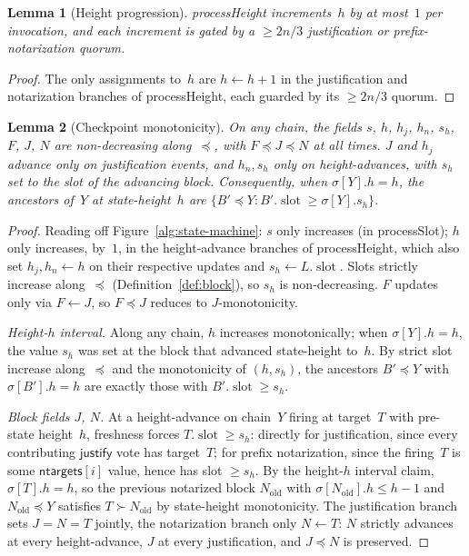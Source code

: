 \documentclass{article}
\newcommand{\slot}[0]{\ensuremath{\operatorname{\mathrm{slot}}}}
\newcommand{\just}{\ensuremath{\mathsf{justify}}\xspace}
\newcommand{\ntargets}{\mathsf{ntargets}}
\newcommand{\processSlot}{\textsf{processSlot}\xspace}
\newcommand{\processHeight}{\textsf{processHeight}\xspace}
\theoremstyle{plain}
\newtheorem{lemma}{Lemma}
\theoremstyle{definition}
\theoremstyle{remark}
\begin{document}
\begin{lemma}[Height progression]\label{lem:heightprog}
\processHeight increments~$h$ by at most~$1$ per invocation, and each increment is gated by a $\geq 2n/3$ justification or prefix-notarization quorum.
\end{lemma}

\begin{proof}
The only assignments to~$h$ are $h \gets h + 1$ in the justification and notarization branches of \processHeight, each guarded by its $\geq 2n/3$ quorum.
\end{proof}

\begin{lemma}[Checkpoint monotonicity]\label{lem:slotmono}
On any chain, the fields $s$, $h$, $h_j$, $h_n$, $s_h$, $F$, $J$, $N$ are non-decreasing along~$\preceq$, with $F \preceq J \preceq N$ at all times.
$J$ and $h_j$ advance only on justification events, and $h_n, s_h$ only on height-advances, with $s_h$ set to the slot of the advancing block.
Consequently, when $\sigma[Y].h = h$, the ancestors of~$Y$ at state-height~$h$ are $\{B' \preceq Y : B'.\slot \geq \sigma[Y].s_h\}$.
\end{lemma}

\begin{proof}
Reading off Figure~\ref{alg:state-machine}: $s$ only increases (in \processSlot); $h$ only increases, by~$1$, in the height-advance branches of \processHeight, which also set $h_j, h_n \gets h$ on their respective updates and $s_h \gets L.\slot$.
Slots strictly increase along~$\preceq$ (Definition~\ref{def:block}), so $s_h$ is non-decreasing.
$F$ updates only via $F \gets J$, so $F \preceq J$ reduces to $J$-monotonicity.

\emph{Height-$h$ interval.}
Along any chain, $h$ increases monotonically; when $\sigma[Y].h = h$, the value $s_h$ was set at the block that advanced state-height to~$h$.
By strict slot increase along~$\preceq$ and the monotonicity of $(h, s_h)$, the ancestors $B' \preceq Y$ with $\sigma[B'].h = h$ are exactly those with $B'.\slot \geq s_h$.

\emph{Block fields $J$, $N$.}
At a height-advance on chain~$Y$ firing at target~$T$ with pre-state height~$h$, freshness forces $T.\slot \geq s_h$: directly for justification, since every contributing \just vote has target~$T$; for prefix notarization, since the firing~$T$ is some $\ntargets[i]$ value, hence has slot $\geq s_h$.
By the height-$h$ interval claim, $\sigma[T].h = h$, so the previous notarized block $N_{\mathrm{old}}$ with $\sigma[N_{\mathrm{old}}].h \leq h-1$ and $N_{\mathrm{old}} \preceq Y$ satisfies $T \succ N_{\mathrm{old}}$ by state-height monotonicity.
The justification branch sets $J = N = T$ jointly, the notarization branch only $N \gets T$: $N$ strictly advances at every height-advance, $J$ at every justification, and $J \preceq N$ is preserved.
\end{proof}
\end{document}
